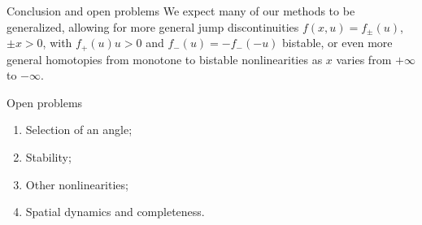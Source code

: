 \documentclass[final]{beamer}
\newlength{\onecolwid}
\begin{document}
\begin{frame}[t]
\begin{columns}[t]
\begin{column}{\onecolwid}




\begin{block}{Conclusion and open problems}
We expect many of our methods to be generalized, allowing for more general jump discontinuities $f(x,u)=f_\pm(u)$, $\pm x>0$, with $f_+(u)u>0$ and $f_-(u)=-f_-(-u)$ bistable, or even more general homotopies from monotone to bistable nonlinearities as $x$ varies from $+\infty$ to $-\infty$.%
% 
\newline

\begin{alertblock}{Open problems}
\begin{enumerate}
\item  Selection of an angle;
\item Stability;
\item  Other nonlinearities;
\item  Spatial dynamics and completeness.
 \end{enumerate}


\end{alertblock}
\end{block}
\end{column}
\end{columns}
\end{frame}
\end{document}
